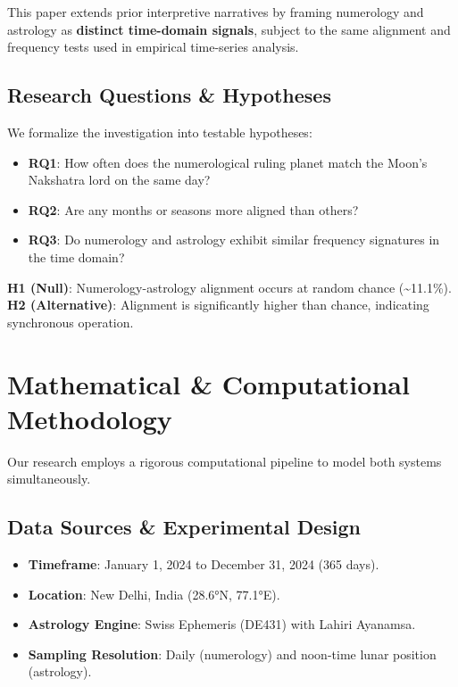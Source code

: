 \documentclass[
  american,
  11pt,
  oneside,
  openany]{article}
\providecommand{\tightlist}{%
  \setlength{\itemsep}{0pt}\setlength{\parskip}{0pt}}
\begin{document}
This paper extends prior interpretive narratives by framing numerology
and astrology as \textbf{distinct time-domain signals}, subject to the
same alignment and frequency tests used in empirical time-series
analysis.

\subsection{Research Questions \&
Hypotheses}\label{research-questions-hypotheses}

We formalize the investigation into testable hypotheses:

\begin{itemize}
\tightlist
\item
  \textbf{RQ1}: How often does the numerological ruling planet match the
  Moon's Nakshatra lord on the same day?
\item
  \textbf{RQ2}: Are any months or seasons more aligned than others?
\item
  \textbf{RQ3}: Do numerology and astrology exhibit similar frequency
  signatures in the time domain?
\end{itemize}

\textbf{H1 (Null)}: Numerology-astrology alignment occurs at random
chance (\textasciitilde11.1\%). \textbf{H2 (Alternative)}: Alignment is
significantly higher than chance, indicating synchronous operation.

\section{Mathematical \& Computational
Methodology}\label{mathematical-computational-methodology}

Our research employs a rigorous computational pipeline to model both
systems simultaneously.

\subsection{Data Sources \& Experimental
Design}\label{data-sources-experimental-design}

\begin{itemize}
\tightlist
\item
  \textbf{Timeframe}: January 1, 2024 to December 31, 2024 (365 days).
\item
  \textbf{Location}: New Delhi, India (28.6°N, 77.1°E).
\item
  \textbf{Astrology Engine}: Swiss Ephemeris (DE431) with Lahiri
  Ayanamsa.
\item
  \textbf{Sampling Resolution}: Daily (numerology) and noon-time lunar
  position (astrology).
\end{itemize}
\end{document}
